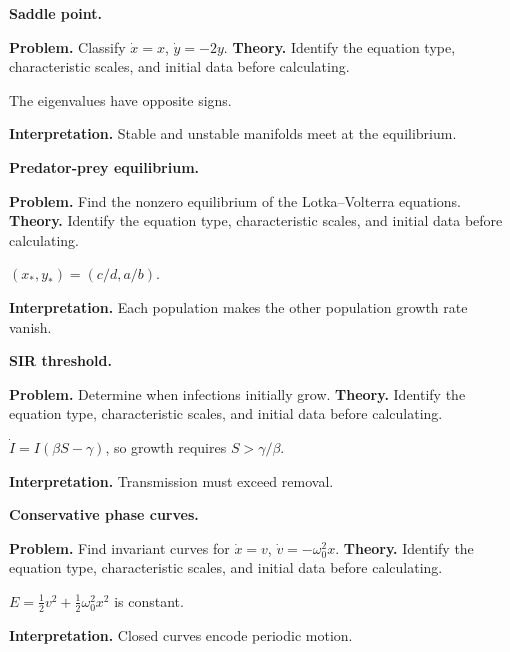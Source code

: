 \begin{workedexample}
\textbf{Saddle point.}\par
\textbf{Problem.} Classify $\dot x=x$, $\dot y=-2y$.
\textbf{Theory.} Identify the equation type, characteristic scales, and initial data before calculating.
\begin{solution}
The eigenvalues have opposite signs.

\textbf{Interpretation.} Stable and unstable manifolds meet at the equilibrium.
\end{solution}
\end{workedexample}

\begin{workedexample}
\textbf{Predator-prey equilibrium.}\par
\textbf{Problem.} Find the nonzero equilibrium of the Lotka--Volterra equations.
\textbf{Theory.} Identify the equation type, characteristic scales, and initial data before calculating.
\begin{solution}
$(x_*,y_*)=(c/d,a/b)$.

\textbf{Interpretation.} Each population makes the other population growth rate vanish.
\end{solution}
\end{workedexample}

\begin{workedexample}
\textbf{SIR threshold.}\par
\textbf{Problem.} Determine when infections initially grow.
\textbf{Theory.} Identify the equation type, characteristic scales, and initial data before calculating.
\begin{solution}
$\dot I=I(\beta S-\gamma)$, so growth requires $S>\gamma/\beta$.

\textbf{Interpretation.} Transmission must exceed removal.
\end{solution}
\end{workedexample}

\begin{workedexample}
\textbf{Conservative phase curves.}\par
\textbf{Problem.} Find invariant curves for $\dot x=v$, $\dot v=-\omega_0^2x$.
\textbf{Theory.} Identify the equation type, characteristic scales, and initial data before calculating.
\begin{solution}
$E=\tfrac12v^2+\tfrac12\omega_0^2x^2$ is constant.

\textbf{Interpretation.} Closed curves encode periodic motion.
\end{solution}
\end{workedexample}


